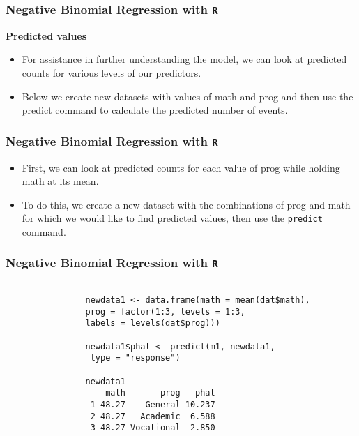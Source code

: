 \documentclass[MASTER.tex]{subfiles}
\begin{document}
	\begin{frame}[fragile]
		\frametitle{Negative Binomial Regression with \texttt{R} }
		\Large
		
		\textbf{Predicted values}
		\begin{itemize}
			\item	For assistance in further understanding the model, we can look at predicted counts for various levels of our predictors. 
			\item Below we create new datasets with values of math and prog and then use the predict command to calculate the predicted number of events.
		\end{itemize}
	\end{frame}
	\begin{frame}[fragile]
		\frametitle{Negative Binomial Regression with \texttt{R} }
		\Large
		
		\begin{itemize}
			\item	First, we can look at predicted counts for each value of prog while holding math at its mean. 
			\item To do this, we create a new dataset with the combinations of prog and math for which we would like to find predicted values, then use the \texttt{predict} command.
		\end{itemize}
	\end{frame}
	\begin{frame}[fragile]
		\frametitle{Negative Binomial Regression with \texttt{R} }
		\large
		
		\begin{framed}
			\begin{verbatim}
			
				newdata1 <- data.frame(math = mean(dat$math), 
				prog = factor(1:3, levels = 1:3, 
				labels = levels(dat$prog)))
				
				newdata1$phat <- predict(m1, newdata1, 
				 type = "response")
				 
				newdata1
				    math       prog   phat
				 1 48.27    General 10.237
				 2 48.27   Academic  6.588
				 3 48.27 Vocational  2.850
			
			\end{verbatim}	
		\end{framed}
		
		
	\end{frame}
\end{document}
